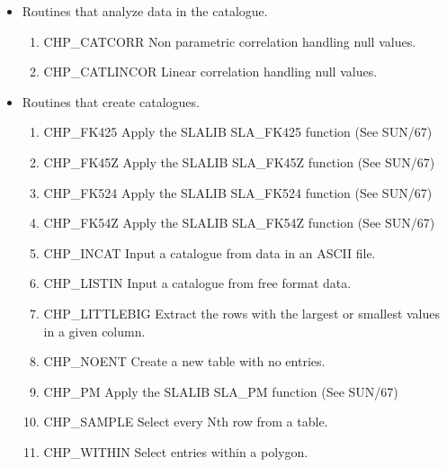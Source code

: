 \begin{itemize}

\item Routines that analyze data in the catalogue.

 \begin{enumerate}
  
  \item CHP\_CATCORR Non parametric correlation handling null values.

  \item CHP\_CATLINCOR Linear correlation handling null values.

 \end{enumerate}

\item Routines that create catalogues.

 \begin{enumerate}

  \item CHP\_FK425 Apply the SLALIB SLA\_FK425 function (See SUN/67)

  \item CHP\_FK45Z Apply the SLALIB SLA\_FK45Z function (See SUN/67)

  \item CHP\_FK524 Apply the SLALIB SLA\_FK524 function (See SUN/67)

  \item CHP\_FK54Z Apply the SLALIB SLA\_FK54Z function (See SUN/67)

  \item CHP\_INCAT Input a catalogue from data in an ASCII file.

  \item CHP\_LISTIN Input a catalogue from free format data.

  \item CHP\_LITTLEBIG Extract the rows with the largest or smallest values in 
a given column.

  \item CHP\_NOENT Create a new table with no entries.

  \item CHP\_PM Apply the SLALIB SLA\_PM function (See SUN/67)

  \item CHP\_SAMPLE Select every Nth row from a table.

  \item CHP\_WITHIN Select entries within a polygon.

 \end{enumerate}


\end{itemize}
